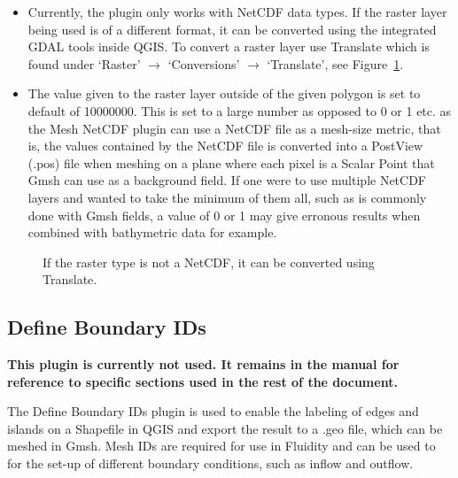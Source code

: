 \begin{itemize}
	\item Currently, the plugin only works with NetCDF data types. If the raster layer being used is of a different format, it can be converted using the integrated GDAL tools inside QGIS. To convert a raster layer use Translate which is found under `Raster' $\rightarrow$ `Conversions' $\rightarrow$ `Translate', see Figure~\ref{fig:rp_translate}.
	\item The value given to the raster layer outside of the given polygon is set to default of 10000000. This is set to a large number as opposed to 0 or 1 etc. as the Mesh NetCDF plugin can use a NetCDF file as a mesh-size metric, that is, the values contained by the NetCDF file is converted into a PostView (.pos) file when meshing on a plane where each pixel is a Scalar Point that Gmsh can use as a background field. If one were to use multiple NetCDF layers and wanted to take the minimum of them all, such as is commonly done with Gmsh fields, a value of 0 or 1 may give erronous results when combined with bathymetric data for example.
\end{itemize}

\begin{figure}[h!]
  \centering
  \caption{If the raster type is not a NetCDF, it can be converted using Translate.}
  \label{fig:rp_translate}
\end{figure}




\newpage
\subsection{Define Boundary IDs}
\label{sec:defineBoundaryIDs}
\large
\textbf{This plugin is currently not used. It remains in the manual for reference to specific sections used in the rest of the document.}
\normalsize

\begin{spacing}{0}
	\small
\end{spacing}
\normalsize
\vspace{8mm}

The Define Boundary IDs plugin is used to enable the labeling of edges and islands on a Shapefile in QGIS and export the result to a .geo file, which can be meshed in Gmsh. Mesh IDs are required for use in Fluidity and can be used to for the set-up of different boundary conditions, such as inflow and outflow.

